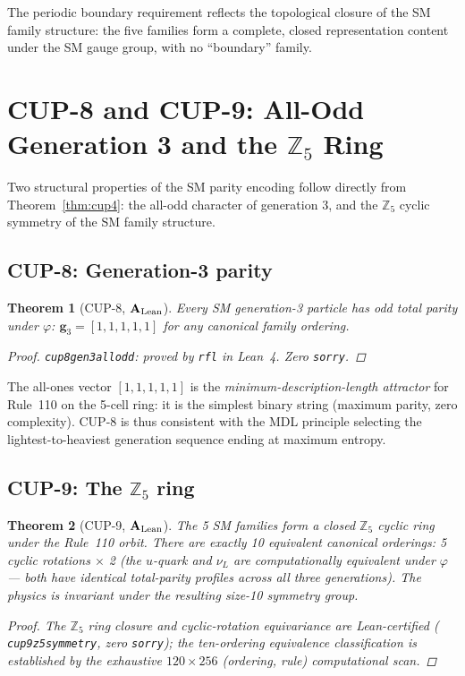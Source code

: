 \documentclass[11pt]{article}
\newtheorem{theorem}{Theorem}[section]
\theoremstyle{remark}
\newcommand{\lean}[1]{%
  \penalty-100
  \begingroup\def\_{\textunderscore\allowbreak}\texttt{#1}\endgroup}
\newcommand{\CatAL}{\ensuremath{\textbf{A}_{\rm Lean}}}
\begin{document}
The periodic boundary requirement reflects the topological closure of the SM family
structure: the five families form a complete, closed representation content under the
SM gauge group, with no ``boundary'' family.

\section{CUP-8 and CUP-9: All-Odd Generation 3 and the $\mathbb{Z}_5$ Ring}
\label{sec:cup89}

Two structural properties of the SM parity encoding follow directly from
Theorem~\ref{thm:cup4}: the all-odd character of generation 3, and the
$\mathbb{Z}_5$ cyclic symmetry of the SM family structure.

\subsection{CUP-8: Generation-3 parity}

\begin{theorem}[CUP-8, $\CatAL$]
\label{thm:cup8}
Every SM generation-3 particle has odd total parity under $\varphi$:
$\mathbf{g}_3 = [1,1,1,1,1]$ for any canonical family ordering.
\begin{proof}
\lean{cup8\_gen3\_all\_odd}: proved by \lean{rfl} in Lean~4. Zero \texttt{sorry}.
\end{proof}
\end{theorem}

The all-ones vector $[1,1,1,1,1]$ is the \emph{minimum-description-length attractor}
for Rule~110 on the 5-cell ring: it is the simplest binary string (maximum parity,
zero complexity). CUP-8 is thus consistent with the MDL principle selecting the
lightest-to-heaviest generation sequence ending at maximum entropy.

\subsection{CUP-9: The $\mathbb{Z}_5$ ring}

\begin{theorem}[CUP-9, $\CatAL$]
\label{thm:cup9}
The 5 SM families form a closed $\mathbb{Z}_5$ cyclic ring under the Rule~110 orbit.
There are exactly 10 equivalent canonical orderings:
5 cyclic rotations $\times$ 2 (the $u$-quark and $\nu_L$ are computationally equivalent
under $\varphi$ --- both have identical total-parity profiles across all three generations).
The physics is invariant under the resulting size-10 symmetry group.
\begin{proof}
The $\mathbb{Z}_5$ ring closure and cyclic-rotation equivariance are Lean-certified
(\lean{cup9\_z5\_symmetry}, zero \texttt{sorry}); the ten-ordering equivalence
classification is established by the exhaustive $120 \times 256$ (ordering, rule)
computational scan.
\end{proof}
\end{theorem}
\end{document}
